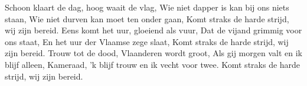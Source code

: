 \beginverse*
Schoon klaart de dag, hoog waait de vlag,
Wie niet dapper is kan bij ons niets staan,
Wie niet durven kan moet ten onder gaan,
Komt straks de harde strijd, wij zijn bereid.
\endverse
\beginverse*
Eens komt het uur, gloeiend als vuur,
Dat de vijand grimmig voor ons staat,
En het uur der Vlaamse zege slaat,
Komt straks de harde strijd, wij zijn bereid.
\endverse
\beginverse*
Trouw tot de dood, Vlaanderen wordt groot,
Als gij morgen valt en ik blijf alleen,
Kameraad, 'k blijf trouw en ik vecht voor twee.
Komt straks de harde strijd, wij zijn bereid.
\endverse
\endsong